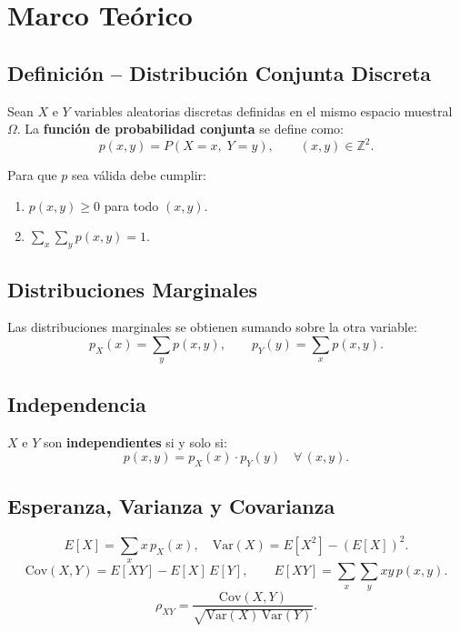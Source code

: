 \documentclass[12pt,a4paper]{article}
\begin{document}
\section{Marco Teórico}

\subsection{Definición – Distribución Conjunta Discreta}

Sean $X$ e $Y$ variables aleatorias discretas definidas en el mismo espacio
muestral $\Omega$.  La \textbf{función de probabilidad conjunta} se define
como:
\[
  p(x,y) = P(X = x,\; Y = y), \qquad (x,y)\in\mathbb{Z}^{2}.
\]

Para que $p$ sea válida debe cumplir:
\begin{enumerate}
  \item $p(x,y)\geq 0$ para todo $(x,y)$.
  \item $\displaystyle\sum_{x}\sum_{y} p(x,y) = 1$.
\end{enumerate}

\subsection{Distribuciones Marginales}

Las distribuciones marginales se obtienen sumando sobre la otra variable:
\[
  p_X(x) = \sum_{y} p(x,y), \qquad
  p_Y(y) = \sum_{x} p(x,y).
\]

\subsection{Independencia}

$X$ e $Y$ son \textbf{independientes} si y solo si:
\[
  p(x,y) = p_X(x)\cdot p_Y(y) \quad \forall\,(x,y).
\]

\subsection{Esperanza, Varianza y Covarianza}

\[
  E[X] = \sum_{x} x\,p_X(x), \quad
  \text{Var}(X) = E[X^2] - (E[X])^2.
\]
\[
  \text{Cov}(X,Y) = E[XY] - E[X]\,E[Y], \qquad
  E[XY] = \sum_{x}\sum_{y} xy\,p(x,y).
\]
\[
  \rho_{XY} = \frac{\text{Cov}(X,Y)}{\sqrt{\text{Var}(X)\,\text{Var}(Y)}}.
\]

\end{document}

